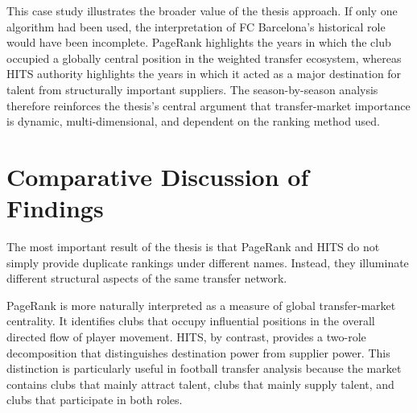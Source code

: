\begin{table}[H]
\centering
{}
\caption{Summary of FC Barcelona's Rankings Across Seasons (Out of 19 Total Seasons)}
\label{tab:barcelona_case_study}
\end{table}

This case study illustrates the broader value of the thesis approach. If only one algorithm had been used, the interpretation of FC Barcelona's historical role would have been incomplete. PageRank highlights the years in which the club occupied a globally central position in the weighted transfer ecosystem, whereas HITS authority highlights the years in which it acted as a major destination for talent from structurally important suppliers. The season-by-season analysis therefore reinforces the thesis's central argument that transfer-market importance is dynamic, multi-dimensional, and dependent on the ranking method used.


\section{Comparative Discussion of Findings}
\label{sec:results_discussion}

The most important result of the thesis is that PageRank and HITS do not simply provide duplicate rankings under different names. Instead, they illuminate different structural aspects of the same transfer network.

PageRank is more naturally interpreted as a measure of global transfer-market centrality. It identifies clubs that occupy influential positions in the overall directed flow of player movement. HITS, by contrast, provides a two-role decomposition that distinguishes destination power from supplier power. This distinction is particularly useful in football transfer analysis because the market contains clubs that mainly attract talent, clubs that mainly supply talent, and clubs that participate in both roles.

